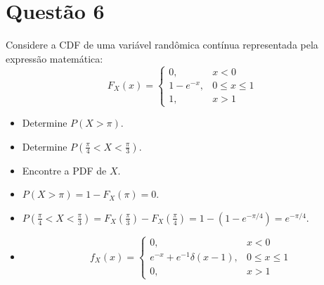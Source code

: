 \section{Questão 6}
Considere a CDF de uma variável randômica contínua representada pela expressão matemática:
%
\begin{equation*}
    F_X(x) = 
    \begin{cases}
        0,     & x < 0 \\
        1 - e^{-x}, & 0 \leq x \leq 1 \\
        1,     & x > 1
    \end{cases}
\end{equation*}

\begin{itemize}
    \item [a)] Determine $P(X > \pi)$.
    \item [b)] Determine $P(\frac{\pi}{4}< X < \frac{\pi}{3})$.
    \item [c)] Encontre a PDF de $X$.
\end{itemize}

\respostas
\begin{itemize}
    \item [a)]
    $P(X > \pi) = 1 - F_X(\pi) = 0$.
    
    \item [b)]
    $P(\frac{\pi}{4}< X < \frac{\pi}{3}) 
    = F_X(\frac{\pi}{3}) - F_X(\frac{\pi}{4})
    = 1 - (1 - e^{-\pi/4})
    = e^{-\pi/4}$.
    
    \item [c)]
    \begin{equation}
        f_X(x) = 
        \begin{cases}
            0,     & x < 0 \\
            e^{-x} + e^{-1}\delta(x-1), & 0 \leq x \leq 1 \\
            0,     & x > 1
        \end{cases}
    \end{equation}
\end{itemize}